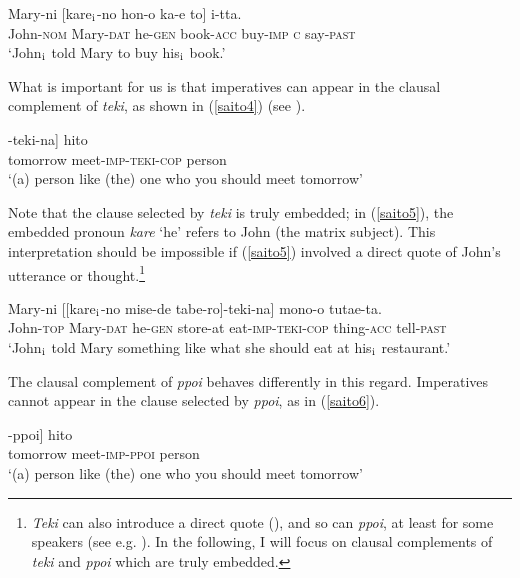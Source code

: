 \documentclass[output=paper]{langscibook}
\begin{document}
\begin{exe}
\ex \label{saito3}
 {Mary-ni} [{kare$_{\textnormal{i}}$-no} {hon-o} {ka-e} {to}] {i-tta}.\\
John-\textsc{nom} Mary-\textsc{dat} he-\textsc{gen} book-\textsc{acc} buy-\textsc{imp} \textsc{c} say-\textsc{past}\\ 
\glt `John$_{\textnormal{i}}$ told Mary to buy his$_{\textnormal{i}}$ book.’     
\end{exe}

What is important for us is that imperatives can appear in the clausal complement of \emph{teki}, as shown in (\ref{saito4}) (see \citealt{Saito2017}).

\begin{exe}
\ex \label{saito4}
\gll [[{asita} {a-e}]-{teki-na}] {hito}\\
tomorrow meet-\textsc{imp}-\textsc{teki}-\textsc{cop} person\\ 
\glt ‘(a) person like (the) one who you should meet tomorrow’
\end{exe}

Note that the clause selected by \emph{teki} is truly embedded; in (\ref{saito5}), the embedded pronoun \emph{kare} ‘he’ refers to John (the matrix subject). This interpretation should be impossible if (\ref{saito5}) involved a direct quote of John’s utterance or thought.\footnote{\emph{Teki} can also introduce a direct quote (\citealt{Saito2017}), and so can \emph{ppoi}, at least for some speakers (see e.g. \citealt{Ohara2010}). In the following, I will focus on clausal complements of \emph{teki} and \emph{ppoi} which are truly embedded.}

\begin{exe}
\ex \label{saito5}
  {Mary-ni} [[{kare$_{\textnormal{i}}$-no} {mise-de} {tabe-ro}]-{teki-na}] {mono-o} {tutae-ta}.\\
John-\textsc{top} Mary-\textsc{dat} he-\textsc{gen} store-at eat-\textsc{imp-teki-cop} thing-\textsc{acc} tell-\textsc{past}\\ 
\glt `John$_\textnormal{i}$ told Mary something like what she should eat at his$_\textnormal{i}$ restaurant.’ 
\end{exe}

The clausal complement of \emph{ppoi} behaves differently in this regard. Imperatives cannot appear in the clause selected by \emph{ppoi}, as in (\ref{saito6}).

\begin{exe}
\ex \label{saito6}
\gll [[{asita} {a-e}]-{ppoi}] {hito}\\
tomorrow meet-\textsc{imp}-\textsc{ppoi} person\\ 
\glt ‘(a) person like (the) one who you should meet tomorrow’
\end{exe}
\end{document}
